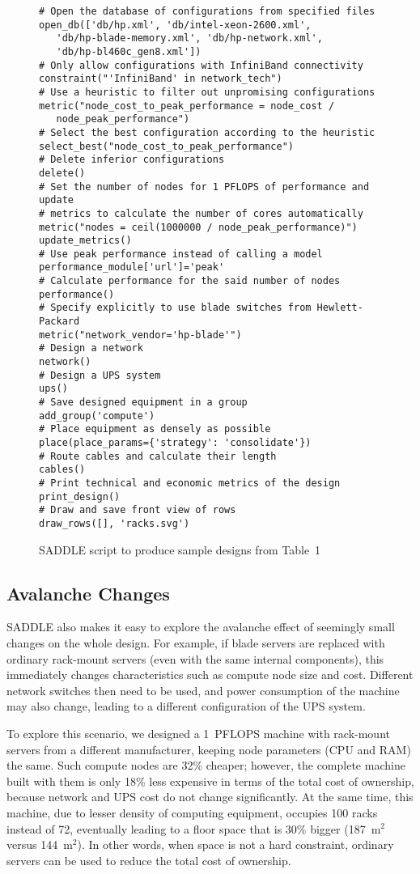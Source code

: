 \documentclass[runningheads,a4paper]{llncs}
\begin{document}
\begin{figure}
\label{saddle-example-script}
\begin{verbatim}
# Open the database of configurations from specified files
open_db(['db/hp.xml', 'db/intel-xeon-2600.xml',
   'db/hp-blade-memory.xml', 'db/hp-network.xml',
   'db/hp-bl460c_gen8.xml'])
# Only allow configurations with InfiniBand connectivity
constraint("'InfiniBand' in network_tech")
# Use a heuristic to filter out unpromising configurations
metric("node_cost_to_peak_performance = node_cost /
   node_peak_performance")
# Select the best configuration according to the heuristic
select_best("node_cost_to_peak_performance")
# Delete inferior configurations
delete()
# Set the number of nodes for 1 PFLOPS of performance and update
# metrics to calculate the number of cores automatically
metric("nodes = ceil(1000000 / node_peak_performance)")
update_metrics()
# Use peak performance instead of calling a model
performance_module['url']='peak'
# Calculate performance for the said number of nodes
performance()
# Specify explicitly to use blade switches from Hewlett-Packard
metric("network_vendor='hp-blade'")
# Design a network
network()
# Design a UPS system
ups()
# Save designed equipment in a group
add_group('compute')
# Place equipment as densely as possible
place(place_params={'strategy': 'consolidate'})
# Route cables and calculate their length
cables()
# Print technical and economic metrics of the design
print_design()
# Draw and save front view of rows
draw_rows([], 'racks.svg')
\end{verbatim}
\caption{SADDLE script to produce sample designs from Table~1}
\end{figure}

\subsection{Avalanche Changes}

SADDLE also makes it easy to explore the avalanche effect of seemingly small changes on the whole design. For example, if blade servers are replaced with ordinary rack-mount servers (even with the same internal components), this immediately changes characteristics such as compute node size and cost. Different network switches then need to be used, and power consumption of the machine may also change, leading to a different configuration of the UPS system.

To explore this scenario, we designed a 1~PFLOPS machine with rack-mount servers from a different manufacturer, keeping node parameters (CPU and RAM) the same. Such compute nodes are 32\% cheaper; however, the complete machine built with them is only 18\% less expensive in terms of the total cost of ownership, because network and UPS cost do not change significantly. At the same time, this machine, due to lesser density of computing equipment, occupies 100 racks instead of 72, eventually leading to a floor space that is 30\% bigger (187~m$^2$ versus 144~m$^2$). In other words, when space is not a hard constraint, ordinary servers can be used to reduce the total cost of ownership.
\end{document}
